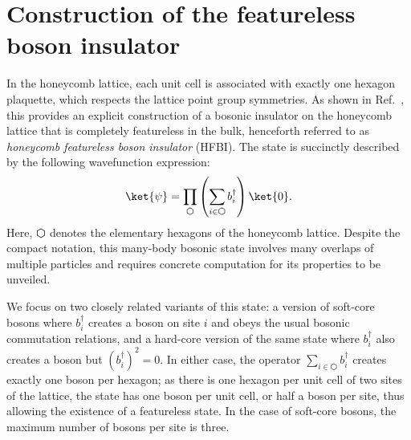 
\section{Construction of the featureless boson insulator}
\label{sec:fbi}

In the honeycomb lattice, each unit cell is associated with exactly one hexagon plaquette, which respects the lattice point group symmetries. As shown in Ref.~, this provides an explicit
construction of a bosonic insulator
on the honeycomb lattice that is completely featureless in the bulk,
henceforth referred to as \emph{honeycomb featureless boson insulator} (HFBI).
The state is succinctly described by the following wavefunction expression:
\begin{equation} \label{eq:def}
\ket{\psi} = \prod\limits_{\varhexagon} \left( \sum\limits_{i \in \varhexagon} b^{\dagger}_{i} \right) \ket{0}.
\end{equation}
Here, $\varhexagon$ denotes the elementary hexagons of the honeycomb
lattice. Despite the compact notation, this many-body bosonic state involves many overlaps of multiple particles and requires concrete computation for its properties to be unveiled.

We focus on two closely related variants of this state: a
version of soft-core bosons where $b_i^\dagger$ creates a boson on
site $i$ and obeys the usual bosonic commutation relations, and a
hard-core version of the same state where $b_i^\dagger$ also creates a
boson but $(b_i^\dagger)^2=0$. In either case, the operator $\sum_{i
\in \varhexagon} b^{\dagger}_{i}$ creates exactly one boson per
hexagon; as there is one hexagon per unit cell of two sites of the
lattice, the state has one boson per unit cell, or half a boson per
site, thus allowing the existence of a featureless state.
In the case of soft-core bosons, the maximum number of bosons
per site is three.


